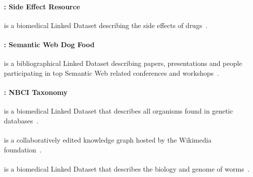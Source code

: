 \paragraph{\sider: Side Effect Resource} is a biomedical Linked Dataset describing the side effects of drugs~\cite{DumontierCCAEBD14}. %

\paragraph{\swdf: Semantic Web Dog Food} is a bibliographical Linked Dataset describing papers, presentations and people participating in top Semantic Web related conferences and workshops~\cite{MollerHHD07}. 

\paragraph{\taxonomy: NBCI Taxonomy} is a biomedical Linked Dataset that describes all organisms found in genetic databases~\cite{DumontierCCAEBD14}.

\paragraph{\wikidata} is a collaboratively edited knowledge graph hosted by the Wikimedia foundation~\cite{MalyshevKGGB18}. 

\paragraph{\wormbase} is a biomedical Linked Dataset that describes the biology and genome of worms~\cite{DumontierCCAEBD14}. 





